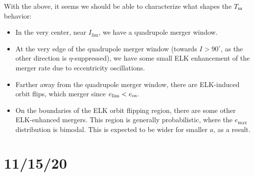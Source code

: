 \documentclass[11pt,
        usenames, %
        dvipsnames %
    ]{article}
\begin{document}
With the above, it seems we should be able to characterize what shapes the
$T_{\rm m}$ behavior:
\begin{itemize}
    \item In the very center, near $I_{\lim}$, we have a quadrupole merger
        window.

    \item At the very edge of the quadrupole merger window (towards $I >
        90^\circ$, as the other direction is $\eta$-suppressed), we have some
        small ELK enhancement of the merger rate due to eccentricity
        oscillations.

    \item Farther away from the quadrupole merger window, there are ELK-induced
        orbit flips, which merger since $e_{\lim} < e_{\rm os}$.

    \item On the boundaries of the ELK orbit flipping region, there are some
        other ELK-enhanced mergers. This region is generally probabilistic,
        where the $e_{\max}$ distribution is bimodal. This is expected to be
        wider for smaller $a$, as a result.
\end{itemize}

\section{11/15/20}
\end{document}
